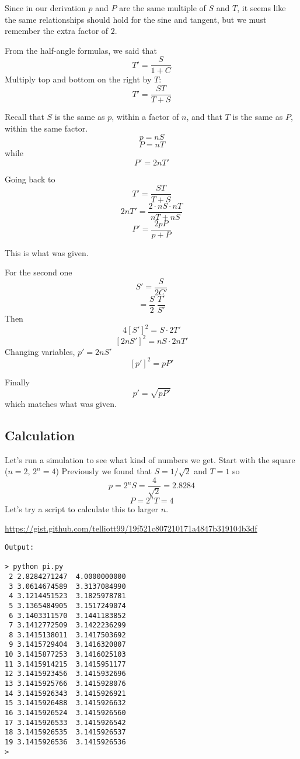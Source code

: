 \documentclass[11pt, oneside]{article}
\begin{document}
Since in our derivation $p$ and $P$ are the same multiple of $S$ and $T$, it seems like the same relationships should hold for the sine and tangent, but we must remember the extra factor of $2$.

From the half-angle formulas, we said that
\[ T'  = \frac{S}{1 + C} \]
Multiply top and bottom on the right by $T$:
\[ T' = \frac{ST}{T + S} \]

Recall that $S$ is the same as $p$, within a factor of $n$, and that $T$ is the same as $P$, within the same factor.
\[ p = nS \]
\[ P = nT \]
while 
\[ P' = 2nT' \]

Going back to 
\[ T' = \frac{ST}{T + S} \]
\[ 2nT' = \frac{2 \cdot nS \cdot nT}{nT + nS} \]
\[ P' = \frac{2pP}{p + P} \]

This is what was given.

For the second one
\[ S' = \frac{S}{2 C'} \]
\[ = \frac{S}{2} \ \frac{T'}{S'} \]
Then
\[ 4[S']^2 = S \cdot 2T' \]
\[ [2nS']^2 = nS \cdot 2nT' \]
Changing  variables, $p' = 2nS'$
\[ [p']^2 = pP' \]

Finally
\[ p' = \sqrt{pP'} \]
which matches what was given.

\subsection*{Calculation}

Let's run a simulation to see what kind of numbers we get.  Start with the square ($n=2$, $2^n = 4$)
Previously we found that $S=1/\sqrt{2}$ and $T=1$ so
\[ p = 2^n S = \frac{4}{\sqrt{2}} = 2.8284 \]
\[ P = 2^n T = 4 \]
Let's try a script to calculate this to larger $n$.

\url{https://gist.github.com/telliott99/19f521c807210171a4847b319104b3df}

\begin{verbatim}        
Output:

> python pi.py
 2 2.8284271247  4.0000000000
 3 3.0614674589  3.3137084990
 4 3.1214451523  3.1825978781
 5 3.1365484905  3.1517249074
 6 3.1403311570  3.1441183852
 7 3.1412772509  3.1422236299
 8 3.1415138011  3.1417503692
 9 3.1415729404  3.1416320807
10 3.1415877253  3.1416025103
11 3.1415914215  3.1415951177
12 3.1415923456  3.1415932696
13 3.1415925766  3.1415928076
14 3.1415926343  3.1415926921
15 3.1415926488  3.1415926632
16 3.1415926524  3.1415926560
17 3.1415926533  3.1415926542
18 3.1415926535  3.1415926537
19 3.1415926536  3.1415926536
> 
\end{verbatim}
\end{document}
